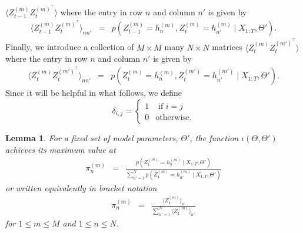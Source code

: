 \documentclass{amsart}
\newtheorem{lemma}[theorem]{Lemma}
\begin{document}
$\langle Z_{t-1}^{(m)}Z_t^{(m)^\intercal}\rangle$ 
where the entry in row $n$ and column $n'$ is given by 
\begin{eqnarray}\label{eqn:bracket2}
\langle Z_{t-1}^{(m)}Z_t^{(m)^\intercal}\rangle_{nn'} &=& 
p\left(Z_{t-1}^{(m)}=h_n^{(m)},Z_t^{(m)}=h_{n'}^{(m)}\mid 
X_{1:T},\Theta'\right).
\end{eqnarray}
Finally, we introduce a collection of $M\times M$ many $N\times N$ 
matrices $\langle 
Z_t^{(m)}Z_t^{(m')^\intercal} \rangle$ where the entry in row $n$ and column $n'$ is 
given by  
\begin{eqnarray}\label{eqn:bracket3}
\langle Z_t^{(m)}Z_t^{(m')^\intercal}\rangle_{nn'} &=& 
p\left(Z_t^{(m)}=h_n^{(m)},Z_t^{(m')}=h_{n'}^{(m')}\mid 
X_{1:T},\Theta'\right).
\end{eqnarray}
Since it will be helpful in what follows, we define 
\[
\delta_{i,j}=\begin{cases}
1 & \text{ if }i=j\\
0 & \text{otherwise}.
\end{cases}
\]


\begin{lemma}\label{lemma:initial}
For a fixed set of model parameters, $\Theta'$, the function $\iota(\Theta,\Theta')$ achieves its maximum value at
\begin{eqnarray*}
\pi_n^{(m)} &=& \frac{p(Z_1^{(m)} = h_n^{(m)}\mid 
X_{1:T},\Theta')}{\sum_{n'=1}^Np(Z_1^{(m)} = h_{n'}^{(m)}\mid 
X_{1:T},\Theta')}
\end{eqnarray*}
or written equivalently in bracket notation
\begin{eqnarray}\label{eqn:updateinitial}
\pi_n^{(m)} &=&\frac{\langle Z_1^{(m)}\rangle_n}{\sum_{n'=1}^N\langle 
Z_1^{(m)}\rangle_{n'}}
\end{eqnarray}
for $1\leq m\leq M$ and $1\leq n\leq N$.
\end{lemma}
\end{document}
